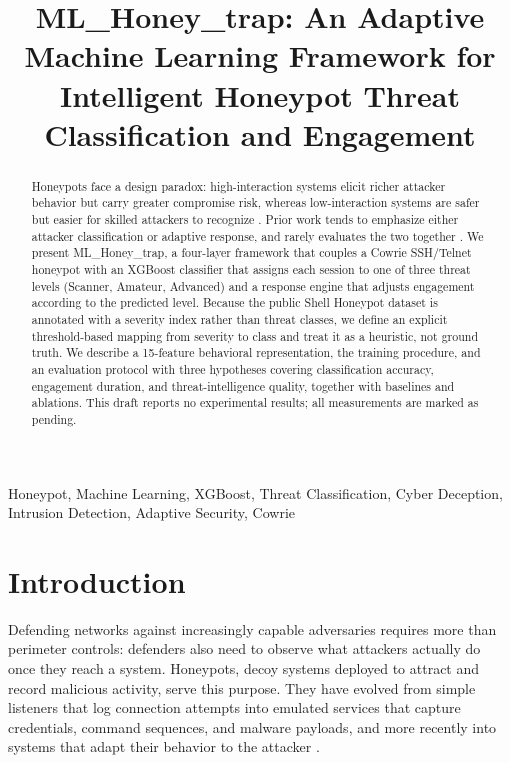 \documentclass[conference]{IEEEtran}
\newcommand{\sys}{ML\_Honey\_trap}
\begin{document}
\title{\sys: An Adaptive Machine Learning Framework for Intelligent Honeypot Threat Classification and Engagement}

\author{
}

\maketitle

\begin{abstract}
Honeypots face a design paradox: high-interaction systems elicit richer attacker behavior but carry greater compromise risk, whereas low-interaction systems are safer but easier for skilled attackers to recognize \cite{ref1,ref12}. Prior work tends to emphasize either attacker classification or adaptive response, and rarely evaluates the two together \cite{ref1,ref2,ref3,ref7}. We present \sys, a four-layer framework that couples a Cowrie SSH/Telnet honeypot with an XGBoost classifier that assigns each session to one of three threat levels (Scanner, Amateur, Advanced) and a response engine that adjusts engagement according to the predicted level. Because the public Shell Honeypot dataset is annotated with a severity index rather than threat classes, we define an explicit threshold-based mapping from severity to class and treat it as a heuristic, not ground truth. We describe a 15-feature behavioral representation, the training procedure, and an evaluation protocol with three hypotheses covering classification accuracy, engagement duration, and threat-intelligence quality, together with baselines and ablations. This draft reports no experimental results; all measurements are marked as pending.
\end{abstract}

\begin{IEEEkeywords}
Honeypot, Machine Learning, XGBoost, Threat Classification, Cyber Deception, Intrusion Detection, Adaptive Security, Cowrie
\end{IEEEkeywords}

\section{Introduction}\label{sec:intro}
Defending networks against increasingly capable adversaries requires more than perimeter controls: defenders also need to observe what attackers actually do once they reach a system. Honeypots, decoy systems deployed to attract and record malicious activity, serve this purpose. They have evolved from simple listeners that log connection attempts into emulated services that capture credentials, command sequences, and malware payloads, and more recently into systems that adapt their behavior to the attacker \cite{ref1,ref12}.
\end{document}

